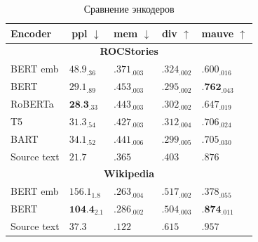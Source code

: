 \documentclass[a4paper, 12pt]{article}
\begin{document}
\begin{table}
\centering
\begin{tabular}{l|llll}
\hline
\multicolumn{1}{l|}{\textbf{Encoder}}
    & \multicolumn{1}{c}{\textbf{ppl} $\downarrow$} 
    & \multicolumn{1}{c}{\textbf{mem} $\downarrow$}
    & \multicolumn{1}{c}{\textbf{div} $\uparrow$}
    & \multicolumn{1}{c}{\textbf{mauve} $\uparrow$}\\
\hline
\multicolumn{5}{c}{\textbf{ROCStories}} \\
\hline
BERT emb & $48.9_{.36}$ & $.371_{.003}$ & $.324_{.002}$ & $.600_{.016}$ \\
BERT & $29.1_{.89}$ & ${.453}_{.003}$ & ${.295}_{.002}$ & $\textbf{.762}_{.043}$ \\
RoBERTa & $\textbf{28.3}_{.33}$ & ${.443}_{.003}$ & ${.302}_{.002}$ & ${.647}_{.019}$\\
T5 & ${31.3}_{.54}$ & $.427_{.003}$ & $.312_{.004}$ & $.706_{.024}$ \\
BART & $34.1_{.52}$ & $.441_{.006}$ & $.299_{.005}$ & $.705_{.030}$\\
\hline
Source text & $21.7$ & $.365$ & $.403$ & $.876$ \\
\hline
\multicolumn{5}{c}{\textbf{Wikipedia}} \\
\hline
BERT emb & $156.1_{1.8}$ & $.263_{.004}$ & $.517_{.002}$ & $.378_{.055}$ \\
BERT & $\textbf{104.4}_{2.1}$ & $.286_{.002}$ & $.504_{.003}$ & $\textbf{.874}_{.011}$ \\
\hline
Source text & $37.3$ & $.122$ & $.615$ & $.957$ \\
\hline
\end{tabular}
\caption{Сравнение энкодеров}
\label{tab::encoders}
\end{table}
\end{document}
